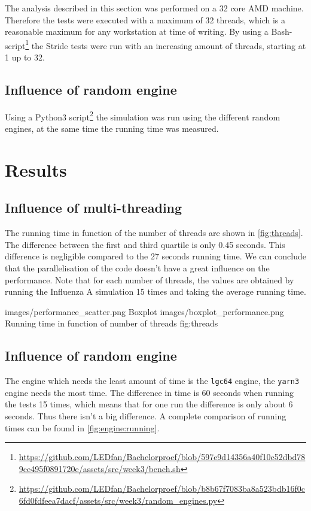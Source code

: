 \documentclass{acmart}
\begin{document}
The analysis described in this section was performed on a 32 core AMD machine. Therefore the tests were executed with a maximum of 32 threads, which is a reasonable maximum for any workstation at time of writing. By using a Bash-script\footnote{\url{https://github.com/LEDfan/Bachelorproef/blob/597e9d14356a40f10c52dbd789ce495f0891720e/assets/src/week3/bench.sh}} %
the Stride tests were run with an increasing amount of threads, starting at 1 up to 32.

\subsection{Influence of random engine}

Using a Python3 script\footnote{\url{https://github.com/LEDfan/Bachelorproef/blob/b8b67f7083ba8a523bdb16f0c6fd0fdfeea7dacf/assets/src/week3/random_engines.py}} %
the simulation was run using the different random engines, at the same time the running time
was measured.

\section{Results}

\subsection{Influence of multi-threading}
The running time in function of the number of threads are shown in \cref{fig:threads}. The difference between the first and third
quartile is only 0.45 seconds. This difference is negligible compared to the 27 seconds running time. We can conclude
that the parallelisation of the code doesn’t have a great influence on the performance.
Note that for each number of threads, the values are obtained by running the Influenza A simulation 15 times and taking the average running time.

    {images/performance_scatter.png}
    {Boxplot}
    {images/boxplot_performance.png}
    {Running time in function of number of threads}
    {fig:threads}
\subsection{Influence of random engine}
The engine which needs the least amount of time is the \texttt{lgc64} engine, the \texttt{yarn3} engine needs the most time. The difference in time is 60 seconds when running the tests 15 times, which means that for one run the difference is only about 6 seconds. Thus there isn’t a big difference. A complete comparison of running times can be found in \cref{fig:engine:running}.
\end{document}

